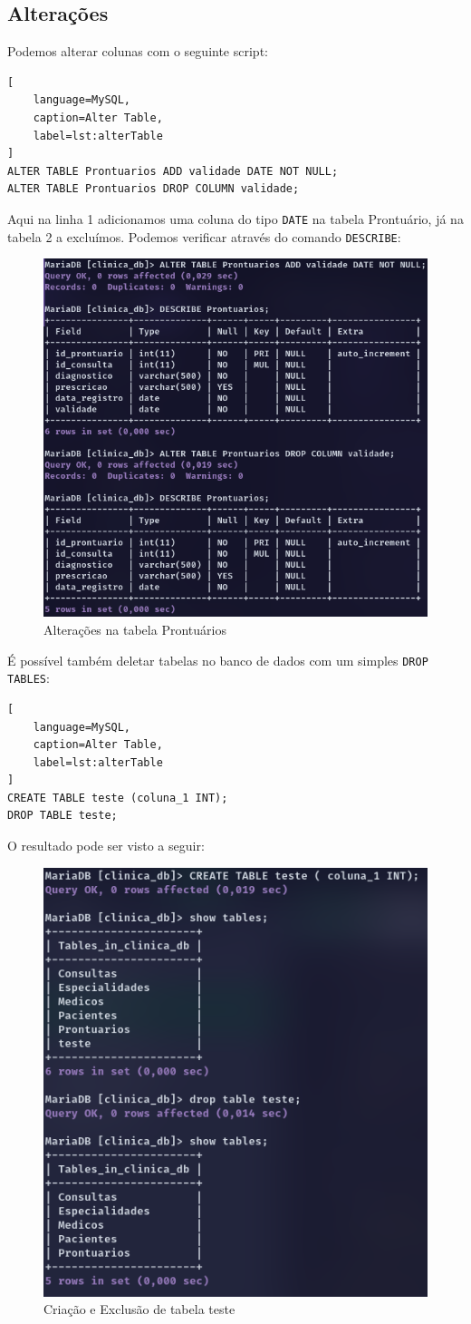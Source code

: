 \subsection{Alterações}

Podemos alterar colunas com o seguinte script:

\begin{lstlisting}[
    language=MySQL,
    caption=Alter Table,
    label=lst:alterTable
]
ALTER TABLE Prontuarios ADD validade DATE NOT NULL;
ALTER TABLE Prontuarios DROP COLUMN validade;  
\end{lstlisting}

Aqui na linha 1 adicionamos uma coluna do tipo \texttt{DATE} na tabela Prontuário, já na tabela 2 a excluímos. Podemos verificar através do comando \texttt{DESCRIBE}:

\begin{figure}[H]
    \centering
    \includegraphics[width=0.85\linewidth]{Text/DDL/Describe.png}
    \caption{Alterações na tabela Prontuários}
    \label{fig:Describe}
\end{figure}

É possível também deletar tabelas no banco de dados com um simples \texttt{DROP TABLES}:

\begin{lstlisting}[
    language=MySQL,
    caption=Alter Table,
    label=lst:alterTable
]
CREATE TABLE teste (coluna_1 INT);
DROP TABLE teste;
\end{lstlisting}

O resultado pode ser visto a seguir:

\begin{figure}[H]
    \centering
    \includegraphics[width=0.50\linewidth]{Text/DDL/drop_table.png}
    \caption{Criação e Exclusão de tabela teste}
    \label{fig:drop_table}
\end{figure}